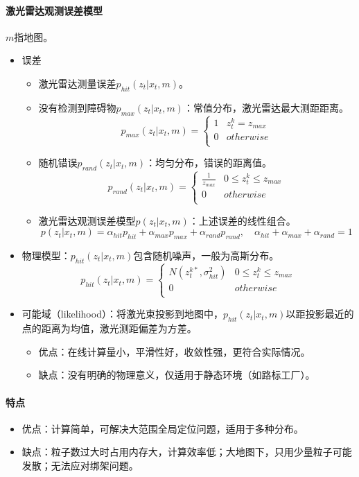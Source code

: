 \documentclass[
12pt, %
a4paper, 
oneside, %
headinclude,footinclude, %
]{scrartcl}
\begin{document}
\paragraph{激光雷达观测误差模型}
$ m $指地图。
\begin{itemize}
\item 误差
\begin{itemize}
\item 激光雷达测量误差$ p_{hit}(z_t|x_t, m) $。
\item 没有检测到障碍物$ p_{max}(z_t|x_t, m) $：常值分布，激光雷达最大测距距离。
$$
p_{max}(z_t|x_t, m) = \begin{cases}
1 & z_t^k = z_{max} \\
0 & otherwise \\
\end{cases}
$$
\item 随机错误$ p_{rand}(z_t|x_t,m) $：均匀分布，错误的距离值。
$$
p_{rand}(z_t|x_t, m) = \begin{cases}
\frac{1}{z_{max}} & 0 \leq z_t^k \leq z_{max} \\
0 & otherwise \\
\end{cases}
$$
\item 激光雷达观测误差模型$ p(z_t|x_t, m) $：上述误差的线性组合。
$$ p(z_t|x_t, m) = \alpha_{hit}p_{hit} + \alpha_{max}p_{max} + \alpha_{rand}p_{rand}, \quad \alpha_{hit} + \alpha_{max} + \alpha_{rand} = 1 $$
\end{itemize}
\item 物理模型：$ p_{hit}(z_t|x_t, m) $包含随机噪声，一般为高斯分布。
$$
p_{hit}(z_t|x_t, m) = \begin{cases}
N(z_t^{k*}, \sigma_{hit}^2) & 0 \leq z_t^k \leq z_{max} \\
0 & otherwise \\
\end{cases}
$$
\item 可能域（likelihood）：将激光束投影到地图中，$ p_{hit}(z_t|x_t, m) $以距投影最近的点的距离为均值，激光测距偏差为方差。
\begin{itemize}
\item 优点：在线计算量小，平滑性好，收敛性强，更符合实际情况。
\item 缺点：没有明确的物理意义，仅适用于静态环境（如路标工厂）。
\end{itemize}
\end{itemize}
\paragraph{特点}
\begin{itemize}
\item 优点：计算简单，可解决大范围全局定位问题，适用于多种分布。
\item 缺点：粒子数过大时占用内存大，计算效率低；大地图下，只用少量粒子可能发散；无法应对绑架问题。
\end{itemize}
\end{document}
